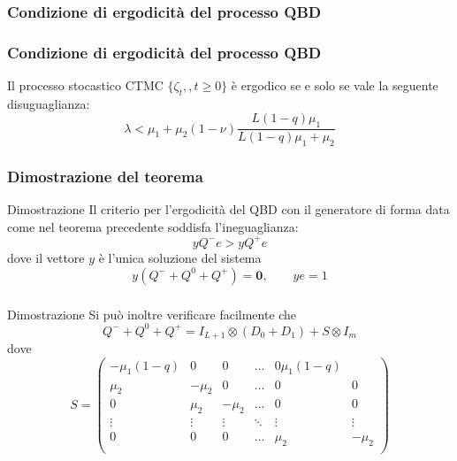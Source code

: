 \documentclass{beamer}
\begin{document}
\subsubsection{Condizione di ergodicità del processo QBD}

\begin{frame}
    \frametitle{Condizione di ergodicità del processo QBD}
    \begin{theorem}
        Il processo stocastico CTMC $\{\zeta_t,,t\geq 0\}$ è ergodico se e solo se vale la seguente disuguaglianza:
        \begin{equation*}\label{eq:ergodicity}
            \lambda < \mu_1 + \mu_2(1 - \nu) \frac{L(1-q)\mu_1}{L(1-q)\mu_1 + \mu_2}
        \end{equation*}
    \end{theorem}
\end{frame}

\begin{frame}
    \frametitle{Dimostrazione del teorema}
    \begin{block}{Dimostrazione}
        Il criterio per l'ergodicità del QBD con il generatore di forma data come nel teorema precedente soddisfa l'ineguaglianza:
        \begin{equation*}
            y Q^- e > y Q^+e
        \end{equation*}
        dove il vettore $y$ è l'unica soluzione del sistema
        \begin{equation*}
            y(Q^- + Q^0 + Q^+) = \textbf{0}, \qquad ye = 1
        \end{equation*}

    \end{block}
\end{frame}


\begin{frame}
    \frametitle{}
    \begin{block}{Dimostrazione}
        Si può inoltre verificare facilmente che
        \begin{equation*}\label{eq:bigotimes}
            Q^- + Q^0 + Q^+ = I_{L+1} \otimes (D_0 + D_1) + S \otimes I_{m}
        \end{equation*}
        dove
        \begin{equation*}
            S =
            \begin{pmatrix}
                -\mu_1 (1-q) & 0 & 0 & \dots & 0 \mu_1(1-q) \\
                \mu_2 & -\mu_2 & 0 & \dots & 0 & 0 \\
                0 & \mu_2 & -\mu_2 & \dots & 0 & 0 \\
                \vdots & \vdots & \vdots & \ddots & \vdots & \vdots \\
                0 & 0 & 0 & \dots & \mu_2 & -\mu_2 \\
            \end{pmatrix}
        \end{equation*}
    \end{block}
\end{frame}
\end{document}
